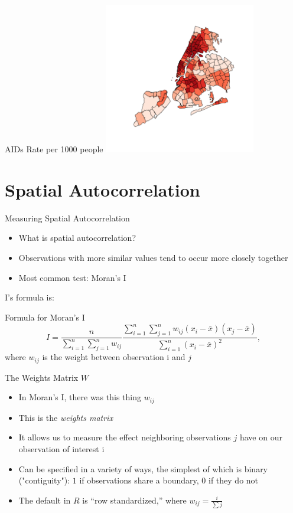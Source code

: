\documentclass[aspectratio = 169, 12pt]{beamer}\usepackage[]{graphicx}\usepackage[]{color}
\newenvironment{knitrout}{}{} %
\begin{document}
\begin{frame}[fragile]{AIDs Rate per 1000 people}
\begin{knitrout}\tiny
{}\color{fgcolor}
\includegraphics[width=250px]{figure/unnamed-chunk-3-1} 

\end{knitrout}

\end{frame}


\section{Spatial Autocorrelation}
\begin{frame}{Measuring Spatial Autocorrelation}
\begin{itemize}
\item What is spatial autocorrelation?
\item Observations with more similar values tend to occur more closely together
\item Most common test: Moran's I
\end{itemize}
\end{frame}

I's formula is:
\begin{frame}{Formula for Moran's I}
\begin{equation*}
I = \frac{n}{\sum_{i=1}^n \sum_{j=1}^n w_{ij}}
\frac{\displaystyle\sum_{i=1}^n \sum_{j=1}^n w_{ij}(x_i - \bar{x})(x_j -
  \bar{x})}{\displaystyle\sum_{i=1}^n (x_i - \bar{x})^2},\label{eq:morani}
\end{equation*}
where $w_{ij}$ is the weight between observation i and $j$
\end{frame}

\begin{frame}{The Weights Matrix $W$}
\begin{itemize}
\item In Moran's I, there was this thing $w_{ij}$
\item This is the \textit{weights matrix}
\item It allows us to measure the effect neighboring observations $j$ have on our observation of interest i
\item Can be specified in a variety of ways, the simplest of which is binary ("contiguity"): $1$ if observations share a boundary, $0$ if they do not
\item The default in $R$ is ``row standardized,'' where $w_{ij} = \frac{i}{\sum j}$
\end{itemize}
\end{frame}
\end{document}

